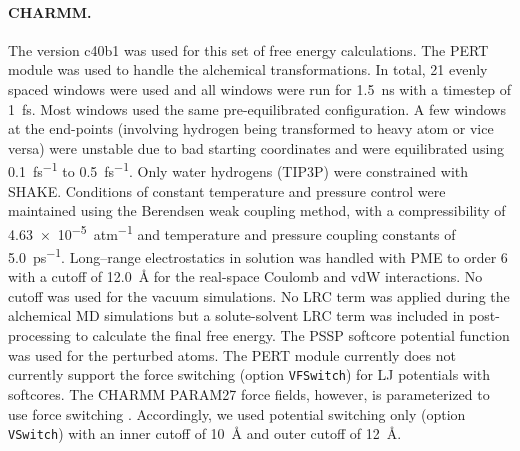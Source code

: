 \documentclass[journal=jctcce,manuscript=article]{achemso}
\newcommand{\inpopt}[1]{\texttt{#1}}
\begin{document}
{\paragraph{CHARMM.} 
The version c40b1 was used for this set of free energy calculations.  
The PERT module was used to handle the alchemical transformations. 
%
In total, 21 evenly spaced windows were used and all windows were run for \SI{1.5}{ns} with a timestep of \SI{1}{fs}.  
Most windows used the same pre-equilibrated configuration. 
A few windows at the end-points (involving hydrogen being transformed to heavy atom or vice versa) were unstable due to bad starting coordinates and were equilibrated using \SI{0.1}{fs^{-1}} to \SI{0.5}{fs^{-1}}.
%
Only water hydrogens (TIP3P) were constrained with SHAKE. 
%
Conditions of constant temperature and pressure control were maintained using the Berendsen weak coupling method, 
with a compressibility of \SI{4.63e-5}{atm^{-1}} and temperature and pressure coupling constants of \SI{5.0}{ps^{-1}}.  
%
Long--range electrostatics in solution was handled with PME to order 6 with a cutoff of \SI{12.0}{\angstrom} for the real-space Coulomb and vdW interactions. 
No cutoff was used for the vacuum simulations.
%
{\color{blue} No LRC term was applied during the alchemical MD simulations but a solute-solvent LRC term was included in post-processing to calculate the final free energy. }
%
The PSSP softcore potential function was used for the perturbed atoms. 
The PERT module currently does not currently support the force switching (option \inpopt{VFSwitch}) for LJ potentials with softcores.  
The CHARMM PARAM27 force fields, however, is parameterized to use force switching \cite{JCC:JCC21287}. 
Accordingly, we used potential switching only (option \inpopt{VSwitch}) with an inner cutoff of \SI{10}{\angstrom} and outer cutoff of \SI{12}{\angstrom}.



}
\end{document}
